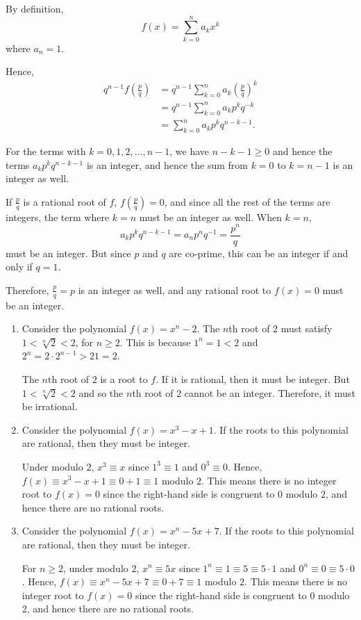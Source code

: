 \Question{\currfilebase}

By definition,
\[
    f(x) = \sum_{k = 0}^{n} a_k x^k
\]
where \(a_n = 1\).

Hence,
\begin{align*}
    q^{n - 1} f\left(\frac{p}{q}\right) & = q^{n - 1} \sum_{k = 0}^{n} a_k \left(\frac{p}{q}\right)^k \\
                                        & = q^{n - 1} \sum_{k = 0}^{n} a_k p^k q^{-k}                 \\
                                        & = \sum_{k = 0}^{n} a_k p^k q^{n - k - 1}.
\end{align*}

For the terms with \(k = 0, 1, 2, \ldots, n - 1\), we have \(n - k - 1 \geq 0\) and hence the terms \(a_k p^k q^{n - k - 1}\) is an integer, and hence the sum from \(k = 0\) to \(k = n - 1\) is an integer as well.

If \(\frac{p}{q}\) is a rational root of \(f\), \(f\left(\frac{p}{q}\right) = 0\), and since all the rest of the terms are integers, the term where \(k = n\) must be an integer as well. When \(k = n\),
\[
    a_k p^k q^{n - k - 1} = a_n p^n q^{-1} = \frac{p^n}{q}
\]
must be an integer. But since \(p\) and \(q\) are co-prime, this can be an integer if and only if \(q = 1\).

Therefore, \(\frac{p}{q} = p\) is an integer as well, and any rational root to \(f(x) = 0\) must be an integer.

\begin{enumerate}
    \item Consider the polynomial \(f(x) = x^n - 2\). The \(n\)th root of \(2\) must satisfy \(1 < \sqrt[n]{2} < 2\), for \(n \geq 2\). This is because \(1^n = 1 < 2\) and \(2^n = 2 \cdot 2^{n - 1} > 2 1 = 2\).

          The \(n\)th root of \(2\) is a root to \(f\). If it is rational, then it must be integer. But \(1 < \sqrt[n]{2} < 2\) and so the \(n\)th root of \(2\) cannot be an integer. Therefore, it must be irrational.

    \item Consider the polynomial \(f(x) = x^3 - x + 1\). If the roots to this polynomial are rational, then they must be integer.

          Under modulo \(2\), \(x^3 \equiv x\) since \(1^3 \equiv 1\) and \(0^3 \equiv 0\). Hence, \(f(x) \equiv x^3 - x + 1 \equiv 0 + 1 \equiv 1\) modulo \(2\). This means there is no integer root to \(f(x) = 0\) since the right-hand side is congruent to \(0\) modulo \(2\), and hence there are no rational roots.

    \item Consider the polynomial \(f(x) = x^n - 5x + 7\). If the roots to this polynomial are rational, then they must be integer.

          For \(n \geq 2\), under modulo \(2\), \(x^n \equiv 5x\) since \(1^n \equiv 1 \equiv 5 \equiv 5 \cdot 1\) and \(0^n \equiv 0 \equiv 5 \cdot 0\). Hence, \(f(x) \equiv x^n - 5x + 7 \equiv 0 + 7 \equiv 1\) modulo \(2\). This means there is no integer root to \(f(x) = 0\) since the right-hand side is congruent to \(0\) modulo 2, and hence there are no rational roots.
\end{enumerate}